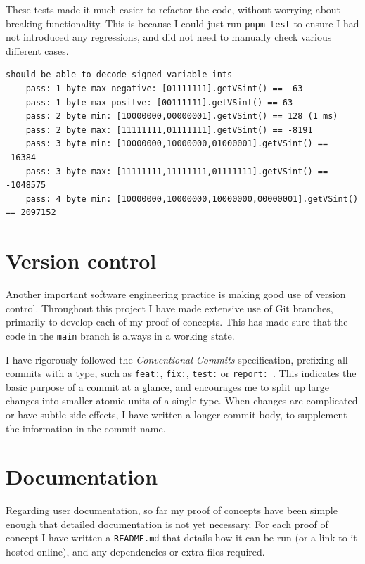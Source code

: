 \documentclass{final_report}
\begin{document}
These tests made it much easier to refactor the code, without worrying about breaking functionality. This is because I could just run \texttt{pnpm test} to ensure I had not introduced any regressions, and did not need to manually check various different cases.

\begin{lstlisting}[caption=Output from the \texttt{.getVSint()} test suite, numbers=none, label=lst:vint-test-output]
should be able to decode signed variable ints
    pass: 1 byte max negative: [01111111].getVSint() == -63
    pass: 1 byte max positve: [00111111].getVSint() == 63
    pass: 2 byte min: [10000000,00000001].getVSint() == 128 (1 ms)
    pass: 2 byte max: [11111111,01111111].getVSint() == -8191
    pass: 3 byte min: [10000000,10000000,01000001].getVSint() == -16384
    pass: 3 byte max: [11111111,11111111,01111111].getVSint() == -1048575
    pass: 4 byte min: [10000000,10000000,10000000,00000001].getVSint() == 2097152
\end{lstlisting}

\section{Version control}

Another important software engineering practice is making good use of version control. Throughout this project I have made extensive use of Git branches, primarily to develop each of my proof of concepts. This has made sure that the code in the \texttt{main} branch is always in a working state.

I have rigorously followed the \emph{Conventional Commits} specification, prefixing all commits with a type, such as \texttt{feat:}, \texttt{fix:}, \texttt{test:} or \texttt{report:}~\cite{conventional-commits}. This indicates the basic purpose of a commit at a glance, and encourages me to split up large changes into smaller atomic units of a single type. When changes are complicated or have subtle side effects, I have written a longer commit body, to supplement the information in the commit name.

\section{Documentation}

Regarding user documentation, so far my proof of concepts have been simple enough that detailed documentation is not yet necessary. For each proof of concept I have written a \texttt{README.md} that details how it can be run (or a link to it hosted online), and any dependencies or extra files required.
\end{document}
